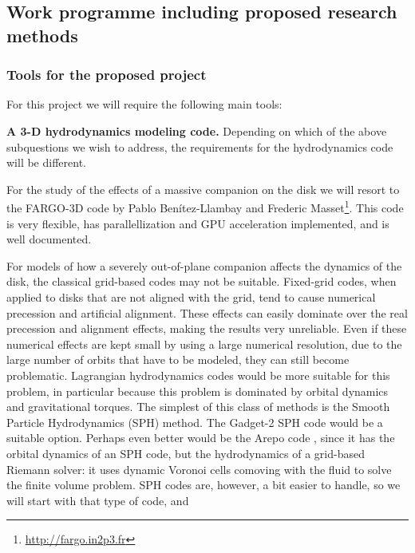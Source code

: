 \documentclass[10pt,fleqn,twoside,a4paper]{article}
\begin{document}
\subsection{Work programme including proposed research methods}

\subsubsection{Tools for the proposed project}
For this project we will require the following main tools:
\begin{compactenumerate}
\item {\bf A 3-D hydrodynamics modeling code.} Depending on which of the
  above subquestions we wish to address, the requirements for the
  hydrodynamics code will be different. 
  \begin{compactitemize}
  \item For the study of the effects of a massive companion on the disk we
    will resort to the FARGO-3D code by Pablo Ben\'itez-Llambay and Frederic
    Masset\footnote{\url{http://fargo.in2p3.fr}}. This code is very
    flexible, has parallellization and GPU acceleration implemented, and is
    well documented.
  \item For models of how a severely out-of-plane companion affects the dynamics of
    the disk, the classical grid-based codes may not be suitable. Fixed-grid
    codes, when applied to disks that are not aligned with the grid, tend to
    cause numerical precession and artificial alignment. These effects can
    easily dominate over the real precession and alignment effects, making
    the results very unreliable. Even if these numerical effects are kept
    small by using a large numerical resolution, due to the large number of
    orbits that have to be modeled, they can still become problematic.
    Lagrangian hydrodynamics codes would be more suitable for this problem,
    in particular because this problem is dominated by orbital dynamics and
    gravitational torques. The simplest of this class of methods is the
    Smooth Particle Hydrodynamics (SPH) method. The Gadget-2 SPH code
    \citep{2005MNRAS.364.1105S} would be a suitable option. Perhaps even
    better would be the Arepo code \citep{2010MNRAS.401..791S}, since it has
    the orbital dynamics of an SPH code, but the hydrodynamics of a
    grid-based Riemann solver: it uses dynamic Voronoi cells comoving with
    the fluid to solve the finite volume problem. SPH codes are, however, a
    bit easier to handle, so we will start with that type of code, and

\end{compactitemize}
\end{compactenumerate}
\end{document}
